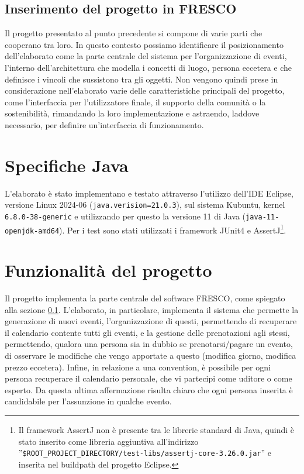 \documentclass[a4paper,11pt]{article}
\begin{document}
	\subsection{Inserimento del progetto in FRESCO} \label{fresco:inserimento-elaborato}
	Il progetto presentato al punto precedente si compone di varie parti che cooperano tra loro. In questo contesto possiamo identificare il posizionamento dell'elaborato come la parte centrale del sistema per l'organizzazione di eventi, l'interno dell'architettura che modella i concetti di luogo, persona eccetera e che definisce i vincoli che sussistono tra gli oggetti. Non vengono quindi prese in considerazione nell'elaborato varie delle caratteristiche principali del progetto, come l'interfaccia per l'utilizzatore finale, il supporto della comunità o la sostenibilità, rimandando la loro implementazione e astraendo, laddove necessario, per definire un'interfaccia di funzionamento.
	
	\section{Specifiche Java}
	L'elaborato è stato implementano e testato attraverso l'utilizzo dell'IDE Eclipse, versione Linux 2024-06 (\texttt{java.verision=21.0.3}), sul sistema Kubuntu, kernel \texttt{6.8.0-38-generic} e utilizzando per questo la versione 11 di Java (\texttt{java-11-openjdk-amd64}).
	Per i test sono stati utilizzati i framework JUnit4 e AssertJ\footnote{Il framework AssertJ non è presente tra le librerie standard di Java, quindi è stato inserito come libreria aggiuntiva all'indirizzo ''\texttt{\$ROOT\_PROJECT\_DIRECTORY/test-libs/assertj-core-3.26.0.jar}'' e inserita nel buildpath del progetto Eclipse.}.
	\section{Funzionalità del progetto}
	Il progetto implementa la parte centrale del software FRESCO, come spiegato alla sezione \ref{fresco:inserimento-elaborato}. L'elaborato, in particolare, implementa il sistema che permette la generazione di nuovi eventi, l'organizzazione di questi, permettendo di recuperare il calendario contente tutti gli eventi, e la gestione delle prenotazioni agli stessi, permettendo, qualora una persona sia in dubbio se prenotarsi/pagare un evento, di osservare le modifiche che vengo apportate a questo (modifica giorno, modifica prezzo eccetera). Infine, in relazione a una convention, è possibile per ogni persona recuperare il calendario personale, che vi partecipi come uditore o come esperto. Da questa ultima affermazione risulta chiaro che ogni persona inserita è candidabile per l'assunzione in qualche evento.
\end{document}
